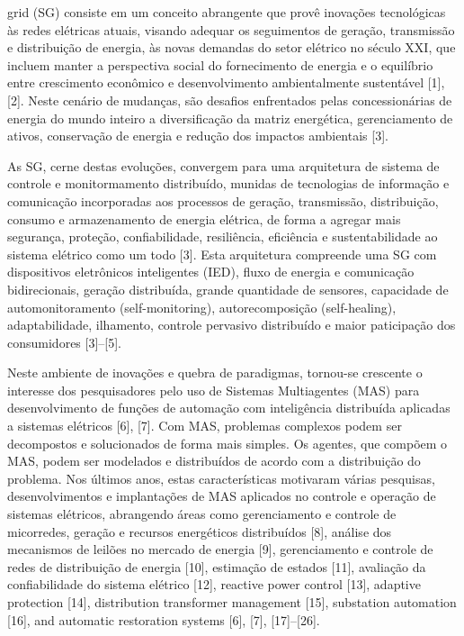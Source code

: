 \documentclass[journal]{IEEEtran}
\begin{document}
 grid (SG) consiste em um conceito abrangente que provê inovações tecnológicas às redes elétricas atuais, visando adequar os seguimentos de geração, transmissão e distribuição de energia, às novas demandas do setor elétrico no século XXI, que incluem manter a perspectiva social do fornecimento de energia e o equilíbrio entre crescimento econômico e desenvolvimento ambientalmente sustentável [1], [2]. Neste cenário de mudanças, são desafios enfrentados pelas concessionárias de energia do mundo inteiro a diversificação da matriz energética, gerenciamento de ativos, conservação de energia e redução dos impactos ambientais [3].

As SG, cerne destas evoluções, convergem para uma arquitetura de sistema de controle e monitormamento distribuído, munidas de tecnologias de informação e comunicação incorporadas aos processos de geração, transmissão, distribuição, consumo e armazenamento de energia elétrica, de forma a agregar mais segurança, proteção, confiabilidade, resiliência, eficiência e sustentabilidade ao sistema elétrico como um todo [3]. Esta arquitetura compreende uma SG com dispositivos eletrônicos inteligentes (IED), fluxo de energia e comunicação bidirecionais, geração distribuída, grande quantidade de sensores, capacidade de automonitoramento (self-monitoring), autorecomposição (self-healing), adaptabilidade, ilhamento, controle pervasivo distribuído e maior paticipação dos consumidores [3]–[5].

Neste ambiente de inovações e quebra de paradigmas, tornou-se crescente o interesse dos pesquisadores pelo uso de Sistemas Multiagentes (MAS) para desenvolvimento de funções de automação com inteligência distribuída aplicadas a sistemas elétricos [6], [7]. Com MAS, problemas complexos podem ser decompostos e solucionados de forma mais simples. Os agentes, que compõem o MAS, podem ser modelados e distribuídos de acordo com a distribuição do problema. Nos últimos anos, estas características motivaram várias pesquisas, desenvolvimentos e implantações de MAS aplicados no controle e operação de sistemas elétricos, abrangendo áreas como gerenciamento e controle de micorredes, geração e recursos energéticos distribuídos [8], análise dos mecanismos de leilões no mercado de energia [9], gerenciamento e controle de redes de distribuição de energia [10], estimação de estados [11], avaliação da confiabilidade do sistema elétrico [12], reactive power control [13], adaptive protection [14], distribution transformer management [15], substation automation [16], and automatic restoration systems [6], [7], [17]–[26]. 
\end{document}
